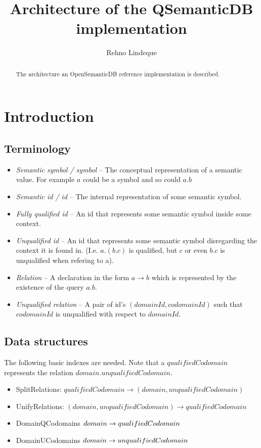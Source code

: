 \documentclass[a4paper,11pt]{article}
\begin{document}
\title{Architecture of the QSemanticDB implementation}
\author{Rehno Lindeque}

\maketitle

\begin{abstract}
The architecture an OpenSemanticDB reference implementation is described.
\end{abstract}

\section{Introduction}

\subsection{Terminology}
\begin{itemize}
\item \emph{Semantic symbol / symbol} -- The conceptual representation of a semantic value. For example $a$ could be a symbol and so could $a.b$
\item \emph{Semantic id / id} -- The internal representation of some semantic symbol.
\item \emph{Fully qualified id} -- An id that represents some semantic symbol inside some context.
\item \emph{Unqualified id} -- An id that represents some semantic symbol disregarding the context it is found in. (I.e. $a.(b.c)$ is qualified, but $c$ or even $b.c$ is unqualified when refering to a).
\item \emph{Relation} -- A declaration in the form $a \rightarrow b$ which is represented by the existence of the query $a.b$.
\item \emph{Unqualified relation} -- A pair of id's $(domainId, codomainId)$ such that $codomainId$ is unqualified with respect to $domainId$.
\end{itemize}

\subsection{Data structures}
The following basic indexes are needed. Note that a $qualifiedCodomain$ represents the relation $domain.unqualifiedCodomain$.
\begin{itemize}
\item SplitRelations: $qualifiedCodomain \rightarrow (domain, unqualifiedCodomain)$
\item UnifyRelations: $(domain, unqualifiedCodomain) \rightarrow qualifiedCodomain$
\item DomainQCodomains $domain \rightarrow \* qualifiedCodomain$
\item DomainUCodomains $domain \rightarrow \* unqualifiedCodomain$
\end{itemize}
\end{document}
